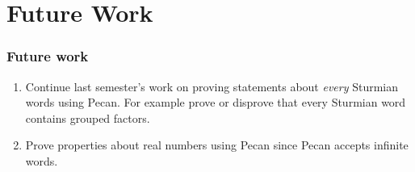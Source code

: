 \documentclass[leqno,presentation]{beamer}
\begin{document}

\section{Future Work}
\begin{frame}
  \frametitle{Future work}
  \begin{enumerate}
  \item Continue last semester's work on proving statements about \emph{every} Sturmian words using Pecan. For example prove or disprove that every Sturmian word contains grouped factors. 
  
  \item Prove properties about real numbers using Pecan since Pecan accepts infinite words.

  \end{enumerate}
  
\end{frame}
\end{document}
